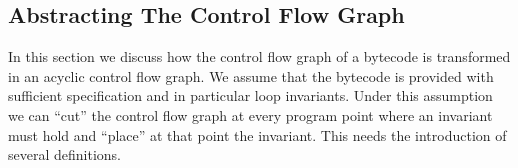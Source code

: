 
\subsection{Abstracting The Control Flow Graph}\label{abstrCntrFlow}
In this section we discuss how the control flow graph of a bytecode is transformed in an acyclic control flow graph. We assume that the bytecode is provided 
with sufficient specification and in particular loop invariants. Under this assumption we can ``cut'' the control flow graph at every program point
where an invariant must hold and ``place'' at that point the invariant. This needs the introduction of several definitions.

     
